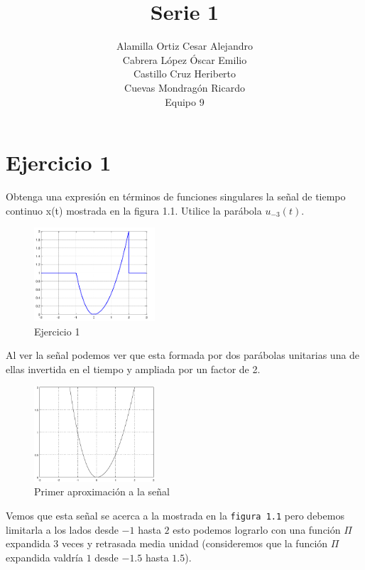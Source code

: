 \documentclass[10pt,a4paper]{report}
\author{Alamilla Ortiz Cesar Alejandro\\Cabrera López Óscar Emilio\\Castillo Cruz Heriberto\\Cuevas Mondragón Ricardo\\Equipo 9}
\title{Serie 1}
\begin{document}
\thispagestyle{fancy}
\maketitle
\tableofcontents
\newpage
\setcounter{chapter}{1}

\section[Ejercicio 1]{Ejercicio 1}

Obtenga una expresión en términos de funciones singulares la señal de tiempo continuo x(t) mostrada en la figura 1.1. Utilice la parábola $u_{-3}(t)$.

\begin{figure}[H]
  \begin{center}
    \includegraphics[width=0.4\textwidth]{Ejercicio1/SignalEjemplo}
    \caption{Ejercicio 1}
    \label{fig:Ejercicio 1}
  \end{center}
\end{figure}

Al ver la señal podemos ver que esta formada por dos parábolas unitarias una de ellas invertida en el tiempo y ampliada por un factor de 2.

\begin{figure}[H]
  \begin{center}
    \includegraphics[width=0.4\textwidth]{Ejercicio1/Aproximacion1}
    \caption{Primer aproximación a la señal}
    \label{fig:Primer aproximación a la señal}
  \end{center}
\end{figure}

Vemos que esta señal se acerca a la mostrada en la \texttt{figura 1.1} pero debemos limitarla a los lados desde $ -1 $ hasta $ 2 $ esto podemos lograrlo con una función $ \Pi $ expandida 3 veces y retrasada media unidad (consideremos que la función $ \Pi $ expandida valdría $ 1 $ desde $ -1.5 $ hasta $ 1.5 $).
\end{document}
